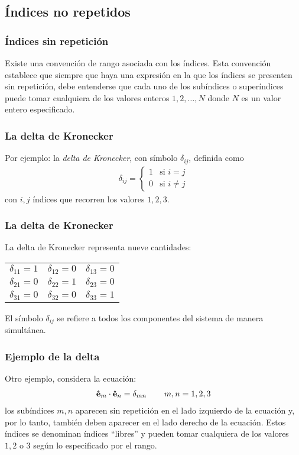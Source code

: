 \documentclass[12pt]{beamer}
\begin{document}
\subsection{Índices no repetidos}
\begin{frame}
\frametitle{Índices sin repetición}
Existe una convención de rango asociada con los índices. Esta convención establece que siempre que haya una expresión en la que los índices se presenten sin repetición, debe entenderse que cada uno de los subíndices o superíndices puede tomar cualquiera de los valores enteros $1,2, \ldots, N$ donde $N$ es un valor entero especificado.
\end{frame}
\begin{frame}
\frametitle{La delta de Kronecker}
Por ejemplo: la \emph{delta de Kronecker}, con símbolo $\delta_{ij}$, definida como
\begin{align*}
\delta_{ij} = \begin{cases}
1 & \mbox{si } i = j \\[0.5em]
0 & \mbox{si } i \neq j
\end{cases}
\end{align*}
con $i, j$ índices que recorren los valores $1, 2, 3$.
\end{frame}
\begin{frame}
\frametitle{La delta de Kronecker}
La delta de Kronecker representa nueve cantidades:
\begin{table}[H]
\large
\centering
\begin{tabular}{c c c}
$\delta_{11} = 1$ & $\delta_{12} = 0$ & $\delta_{13} = 0$ \\
$\delta_{21} = 0$ & $\delta_{22} = 1$ & $\delta_{23} = 0$ \\
$\delta_{31} = 0$ & $\delta_{32} = 0$ & $\delta_{33} = 1$
\end{tabular}
\end{table}
El símbolo $\delta_{ij}$ se refiere a todos los componentes del sistema de manera simultánea.
\end{frame}
\begin{frame}
\frametitle{Ejemplo de la delta}
Otro ejemplo, considera la ecuación:
\begin{align}
\vu{e}_{m} \cdot \vu{e}_{n} = \delta_{mn} \hspace{0.75cm} m, n = 1, 2, 3
\label{eq:ecuacion_01_01}
\end{align}
los subíndices $m, n$ aparecen sin repetición en el lado izquierdo de la ecuación y, por lo tanto, también deben aparecer en el lado derecho de la ecuación. \pause Estos índices se denominan índices \enquote{libres} y pueden tomar cualquiera de los valores $1, 2$ o $3$ según lo especificado por el rango.
\end{frame}
\end{document}
